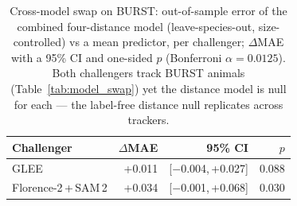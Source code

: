 \begin{table}[htbp]\centering
  \caption[Cross-model distance-model results]{Cross-model swap on BURST: out-of-sample error of the combined four-distance model (leave-species-out,
  size-controlled) vs a mean predictor, per challenger; $\Delta$MAE with a 95\% CI and one-sided $p$
  (Bonferroni $\alpha=0.0125$). Both challengers track BURST animals (Table~\ref{tab:model_swap}) yet the
  distance model is null for each --- the label-free distance null replicates across trackers.}
  \label{tab:model_swap_cv}
  \begin{tabular}{lrrr}
    \toprule
    Challenger & $\Delta$MAE & 95\% CI & $p$ \\
    \midrule
    GLEE                  & +0.011 & [$-$0.004,\,+0.027] & 0.088 \\
    Florence-2\,+\,SAM\,2 & +0.034 & [$-$0.001,\,+0.068] & 0.030 \\
    \bottomrule
  \end{tabular}
\end{table}
